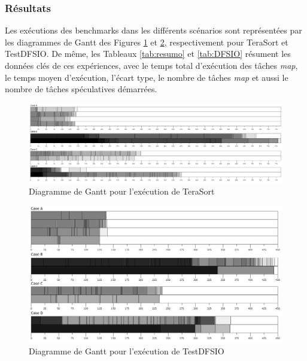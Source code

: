 \subsubsection{Résultats\label{sec:5.4}} 

Les exécutions des benchmarks dans les différents scénarios sont représentées par les diagrammes de Gantt des Figures \ref{fig:gantts} et \ref{fig:DFSIO}, respectivement pour TeraSort et TestDFSIO. De même, les Tableaux \ref{tab:resumo} et \ref{tab:DFSIO} résument les données clés de ces expériences, avec le temps total d'exécution des tâches \textit{map}, le temps moyen d'exécution, l'écart type, le nombre de tâches \textit{map} et aussi le nombre de tâches spéculatives démarrées.  

\begin{figure}[!ht]
	\centering
	\includegraphics[width=1\textwidth]{img/todos}
	\caption{Diagramme de Gantt pour l'exécution de TeraSort}
	\label{fig:gantts}
\end{figure}

\begin{figure}[!ht]
	\centering
	\includegraphics[width=1\textwidth]{img/todos-DFSIO}
	\caption{Diagramme de Gantt pour l'exécution de TestDFSIO}
	\label{fig:DFSIO}
\end{figure}



